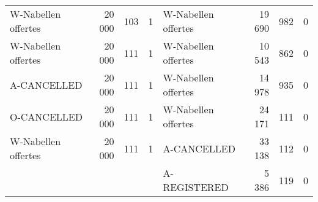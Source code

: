 \begin{table}
\begin{tabular}{lrlrlrlr}
W-Nabellen offertes & 20 000 & 103 & 1 & W-Nabellen offertes & 19 690 & 982 & 0 \\
W-Nabellen offertes & 20 000 & 111 & 1 & W-Nabellen offertes & 10 543 & 862 & 0 \\
A-CANCELLED & 20 000 & 111 & 1 & W-Nabellen offertes & 14 978 & 935 & 0 \\
O-CANCELLED & 20 000 & 111 & 1 & W-Nabellen offertes & 24 171 & 111 & 0 \\
W-Nabellen offertes & 20 000 & 111 & 1 & A-CANCELLED & 33 138 & 112 & 0 \\
 &  &  &  & A-REGISTERED & 5 386 & 119 & 0 \\
\bottomrule
\end{tabular}
\end{table}
